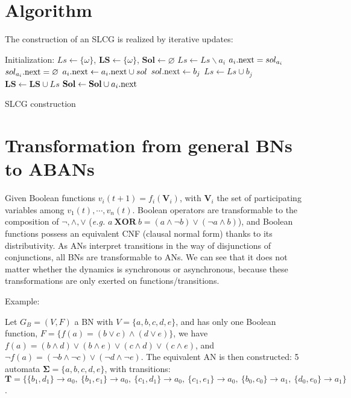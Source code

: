 \documentclass[runningheads]{llncs}
\newcommand{\acm}[3]{#1\rightarrow#2}
\begin{document}
\section{Algorithm}\label{appendix:B}
The construction of an SLCG is realized by iterative updates:
\begin{algorithm}[ht]
\begin{algorithmic}
\State Initialization: 
$Ls\gets \{\omega\}$, $\mathbf{LS}\gets\{\omega\}$, $\mathbf{Sol}\gets \varnothing$
		\State $Ls\gets Ls\backslash a_i$
			\State $a_i{\rm .next}=sol_{a_i}$
            \State $sol_{a_i}{\rm .next}=\varnothing$
    	\Else
    		\For{$sol=\acm{A}{a_{\lnot i}}{a_i}\in \mathbf{T}$}
    			\State $a_i{\rm .next}\gets a_i{\rm .next}\cup sol$
    				\State $sol{\rm .next}\gets b_j$
    			\EndFor
    			\State $Ls\gets Ls\cup b_j$
                \State $\mathbf{LS}\gets \mathbf{LS}\cup Ls$
    		\EndFor
    		\State$\mathbf{Sol}\gets \mathbf{Sol}\cup a_i{\rm .next}$           
    	\EndIf
	\EndFor
\EndWhile
\State{}
\end{algorithmic}
\caption{SLCG construction}
\label{algorithm:2}
\end{algorithm}
\section{Transformation from general BNs to ABANs}\label{appendix:C}

Given Boolean functions $v_i (t+1)=f_i (\mathbf{V}_i)$, with $\mathbf{V}_i$ the set of participating variables among $v_1 (t),\cdots,v_n (t)$.
Boolean operators are transformable to the composition of $\lnot,\land,\lor$ (\textit{e.g.} $a\ \mathbf{XOR} \ b = (a\land \lnot b)\lor (\lnot a\land b)$), and Boolean functions possess an equivalent CNF (clausal normal form) thanks to its distributivity.
As ANs interpret transitions in the way of disjunctions of conjunctions, all BNs are transformable to ANs. 
We can see that it does not matter whether the dynamics is synchronous or asynchronous, because these transformations are only exerted on functions/transitions.

Example: 

Let $G_B=(V,F)$ a BN with $V=\{a,b,c,d,e\}$, and has only one Boolean function, $F=\{f (a)= (b\lor c)\land (d\lor e)\}$, we have 
$f (a)= (b\land d)\lor (b\land e)\lor (c\land d)\lor (c\land e)$, and $\lnot f (a)= (\lnot b\land \lnot c)\lor (\lnot d\land \lnot e)$. 
The equivalent AN is then constructed: 5 automata $\mathbf{\Sigma}=\{a,b,c,d,e\}$, with transitions: $\mathbf{T}=\{\acm{\{b_1,d_1\}}{a_0}{a_1},\ \acm{\{b_1,e_1\}}{a_0}{a_1},\ \acm{\{c_1,d_1\}}{a_0}{a_1},\ \acm{\{c_1,e_1\}}{a_0}{a_1},\ \acm{\{b_0,c_0\}}{a_1}{a_0},\ \acm{\{d_0,e_0\}}{a_1}{a_0}\}$.


\end{document}
